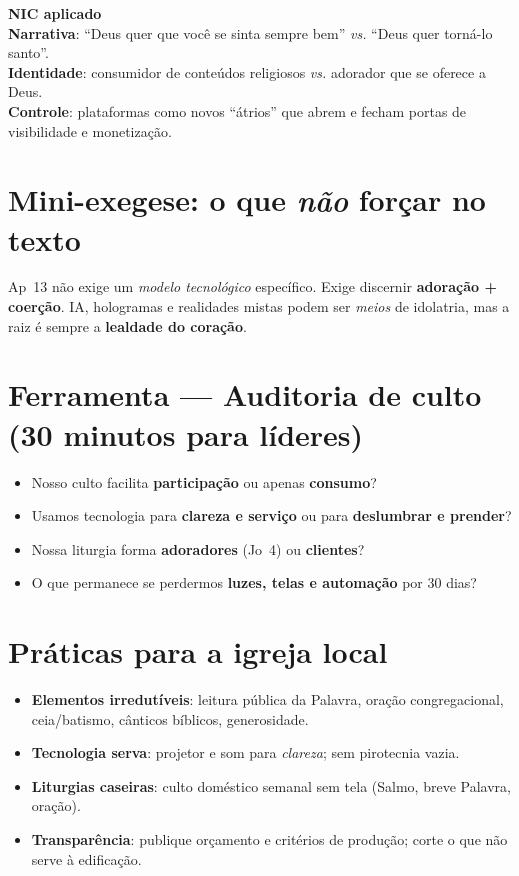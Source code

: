 \begin{nicbox}
\textbf{NIC aplicado}\\
\textbf{Narrativa}: ``Deus quer que você se sinta sempre bem'' \emph{vs.} ``Deus quer torná-lo santo''.\\
\textbf{Identidade}: consumidor de conteúdos religiosos \emph{vs.} adorador que se oferece a Deus.\\
\textbf{Controle}: plataformas como novos ``átrios'' que abrem e fecham portas de visibilidade e monetização.
\end{nicbox}

\section{Mini-exegese: o que \emph{não} forçar no texto}
Ap~13 não exige um \emph{modelo tecnológico} específico. Exige discernir \textbf{adoração + coerção}. IA, hologramas e realidades mistas podem ser \emph{meios} de idolatria, mas a raiz é sempre a \textbf{lealdade do coração}. 

\section{Ferramenta — Auditoria de culto (30 minutos para líderes)}
\begin{checklist}[title={Perguntas para o conselho/produção}]
\begin{itemize}[leftmargin=*,noitemsep]
  \item Nosso culto facilita \textbf{participação} ou apenas \textbf{consumo}? 
  \item Usamos tecnologia para \textbf{clareza e serviço} ou para \textbf{deslumbrar e prender}? 
  \item Nossa liturgia forma \textbf{adoradores} (Jo~4) ou \textbf{clientes}?
  \item O que permanece se perdermos \textbf{luzes, telas e automação} por 30 dias?
\end{itemize}
\end{checklist}

\section{Práticas para a igreja local}
\begin{checklist}
\begin{itemize}[leftmargin=*,noitemsep]
  \item \textbf{Elementos irredutíveis}: leitura pública da Palavra, oração congregacional, ceia/batismo, cânticos bíblicos, generosidade.
  \item \textbf{Tecnologia serva}: projetor e som para \emph{clareza}; sem pirotecnia vazia.
  \item \textbf{Liturgias caseiras}: culto doméstico semanal sem tela (Salmo, breve Palavra, oração).
  \item \textbf{Transparência}: publique orçamento e critérios de produção; corte o que não serve à edificação.
\end{itemize}
\end{checklist}


